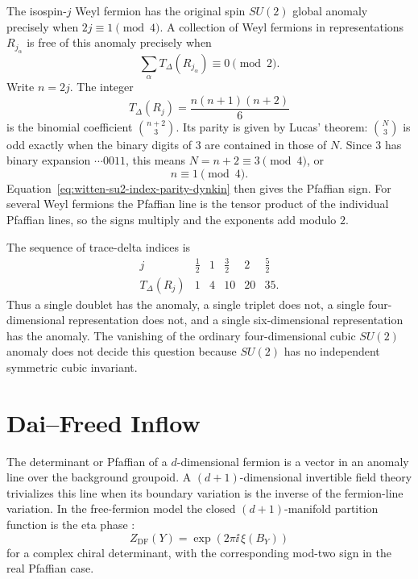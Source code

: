 The isospin-\(j\) Weyl fermion has the original spin \(SU(2)\) global anomaly
precisely when \(2j\equiv1\pmod4\).  A collection of Weyl fermions in
representations \(R_{j_\alpha}\) is free of this anomaly precisely when
\begin{equation}
  \sum_\alpha T_\Delta(R_{j_\alpha})
  \equiv0
  \pmod2 .
  \label{eq:su2-global-anomaly-cancellation-condition}
\end{equation}
Write \(n=2j\).  The integer
\[
  T_\Delta(R_j)=\frac{n(n+1)(n+2)}6
\]
is the binomial coefficient \(\binom{n+2}{3}\).  Its parity is given by
Lucas' theorem: \(\binom{N}{3}\) is odd exactly when the binary digits of
\(3\) are contained in those of \(N\).  Since \(3\) has binary expansion
\(\cdots 0011\), this means \(N=n+2\equiv3\pmod4\), or
\[
  n\equiv1\pmod4 .
\]
Equation~\eqref{eq:witten-su2-index-parity-dynkin} then gives the Pfaffian
sign.  For several Weyl fermions the Pfaffian line is the tensor product of
the individual Pfaffian lines, so the signs multiply and the exponents add
modulo \(2\).

\begin{example}
\label{ex:su2-global-anomaly-first-representations}
The sequence of trace-delta indices is
\[
\begin{array}{c|ccccc}
j & \frac12 & 1 & \frac32 & 2 & \frac52\\
\hline
T_\Delta(R_j) & 1 & 4 & 10 & 20 & 35 .
\end{array}
\]
Thus a single doublet has the anomaly, a single triplet does not, a
single four-dimensional representation does not, and a single
six-dimensional representation has the anomaly.  The vanishing of the
ordinary four-dimensional cubic \(SU(2)\) anomaly does not decide this
question because \(SU(2)\) has no independent symmetric cubic invariant.
\end{example}

\section{Dai--Freed Inflow}

The determinant or Pfaffian of a \(d\)-dimensional fermion is a vector in an
anomaly line over the background groupoid.  A \((d+1)\)-dimensional
invertible field theory trivializes this line when its boundary variation is
the inverse of the fermion-line variation.  In the free-fermion model the
closed \((d+1)\)-manifold partition function is the eta phase
\cite{DaiFreed1994,Freed1995DeterminantRevisited}:
\begin{equation}
  Z_{\mathrm{DF}}(Y)
  =
  \exp\!\left(2\pi\ii\,\xi(B_Y)\right)
  \label{eq:dai-freed-closed-phase}
\end{equation}
for a complex chiral determinant, with the corresponding mod-two sign in the
real Pfaffian case.

